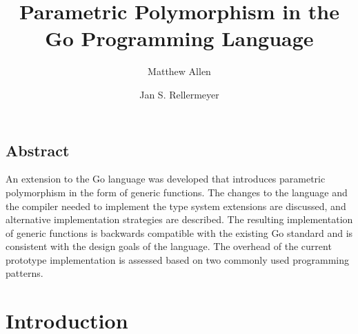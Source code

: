 \documentclass[letterpaper,11pt]{article}
\begin{document}
\date{}

\title{\Large \bf Parametric Polymorphism in the Go Programming Language}

\author[1]{Matthew Allen}
\author[1,2]{Jan S. Rellermeyer}
\renewcommand\Authands{ and }


\maketitle

\thispagestyle{empty}


\subsection*{Abstract}
An extension to the Go language was developed that introduces parametric polymorphism in the form of generic functions. The changes to the language and the compiler needed to implement the type system extensions are discussed, and alternative implementation strategies are described. The resulting implementation of generic functions is backwards compatible with the existing Go standard and is consistent with the design goals of the language. The overhead of the current prototype implementation is assessed based on two commonly used programming patterns. 

\section{Introduction} \label{introduction}
\end{document}
